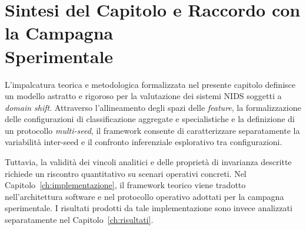 \section[Sintesi del Capitolo e Raccordo con la Campagna Sperimentale]{Sintesi del Capitolo e Raccordo con la Campagna\\Sperimentale}
\label{sec:sintesi_raccordo_ch4}

L'impalcatura teorica e metodologica formalizzata nel presente capitolo definisce un modello astratto e rigoroso per la valutazione dei sistemi NIDS soggetti a \textit{domain shift}. 
Attraverso l'allineamento degli spazi delle \textit{feature}, la formalizzazione delle configurazioni di classificazione aggregate e specialistiche e la definizione di un protocollo \textit{multi-seed}, il framework consente di caratterizzare separatamente la variabilità inter-seed e il confronto inferenziale esplorativo tra configurazioni.

Tuttavia, la validità dei vincoli analitici e delle proprietà di invarianza descritte richiede un riscontro quantitativo su scenari operativi concreti. 
Nel Capitolo~\ref{ch:implementazione}, il framework teorico viene tradotto nell'architettura software e nel protocollo operativo adottati per la campagna sperimentale. I risultati prodotti da tale implementazione sono invece analizzati separatamente nel Capitolo~\ref{ch:risultati}.